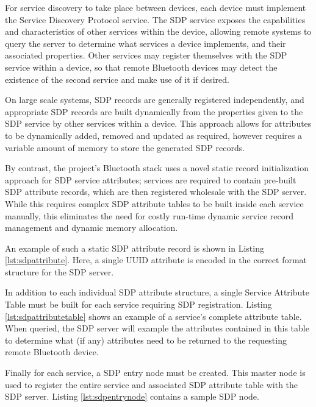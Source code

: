 For service discovery to take place between devices, each device must implement the Service Discovery Protocol service. The SDP service exposes the capabilities and characteristics of other services within the device, allowing remote systems to query the server to determine what services a device implements, and their associated properties. Other services may register themselves with the SDP service within a device, so that remote Bluetooth devices may detect the existence of the second service and make use of it if desired.

On large scale systems, SDP records are generally registered independently, and appropriate SDP records are built dynamically from the properties given to the SDP service by other services within a device. This approach allows for attributes to be dynamically added, removed and updated as required, however requires a variable amount of memory to store the generated SDP records. 

By contrast, the project's Bluetooth stack uses a novel static record initialization approach for SDP service attributes; services are required to contain pre-built SDP attribute records, which are then registered wholesale with the SDP server. While this requires complex SDP attribute tables to be built inside each service manually, this eliminates the need for costly run-time dynamic service record management and dynamic memory allocation.

An example of such a static SDP attribute record is shown in Listing \ref{lst:sdpattribute}. Here, a single UUID attribute is encoded in the correct format structure for the SDP server.



In addition to each individual SDP attribute structure, a single Service Attribute Table must be built for each service requiring SDP registration. Listing \ref{lst:sdpattributetable} shows an example of a service's complete attribute table. When queried, the SDP server will example the attributes contained in this table to determine what (if any) attributes need to be returned to the requesting remote Bluetooth device.



Finally for each service, a SDP entry node must be created. This master node is used to register the entire service and associated SDP attribute table with the SDP server. Listing \ref{lst:sdpentrynode} contains a sample SDP node.

